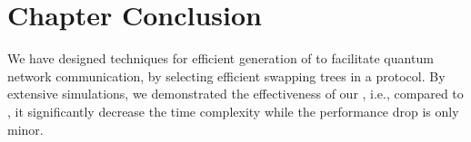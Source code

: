 \vspace{-0.1in}
\section{Chapter Conclusion}
\label{sec:swapping_conc}

We have designed techniques for efficient generation of \eps to facilitate quantum
network communication, by selecting efficient swapping trees in a \wt protocol.
By extensive simulations, we demonstrated the effectiveness of our \dpalt, i.e., compared to \dpa, it significantly decrease the time complexity
while the performance drop is only minor.

